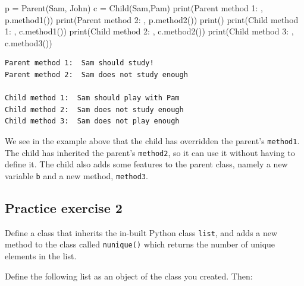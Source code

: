 \documentclass[
  letterpaper,
  DIV=11,
  numbers=noendperiod]{scrreprt}
\newenvironment{Shaded}{\begin{snugshade}}{\end{snugshade}}
\newcommand{\BuiltInTok}[1]{\textcolor[rgb]{0.00,0.23,0.31}{#1}}
\newcommand{\NormalTok}[1]{\textcolor[rgb]{0.00,0.23,0.31}{#1}}
\newcommand{\OperatorTok}[1]{\textcolor[rgb]{0.37,0.37,0.37}{#1}}
\newcommand{\StringTok}[1]{\textcolor[rgb]{0.13,0.47,0.30}{#1}}
\begin{document}
\begin{Shaded}
\begin{Highlighting}[]
\NormalTok{p }\OperatorTok{=}\NormalTok{ Parent(}\StringTok{\textquotesingle{}Sam\textquotesingle{}}\NormalTok{, }\StringTok{\textquotesingle{}John\textquotesingle{}}\NormalTok{)}
\NormalTok{c }\OperatorTok{=}\NormalTok{ Child(}\StringTok{\textquotesingle{}Sam\textquotesingle{}}\NormalTok{,}\StringTok{\textquotesingle{}Pam\textquotesingle{}}\NormalTok{)}
\BuiltInTok{print}\NormalTok{(}\StringTok{\textquotesingle{}Parent method 1: \textquotesingle{}}\NormalTok{, p.method1())}
\BuiltInTok{print}\NormalTok{(}\StringTok{\textquotesingle{}Parent method 2: \textquotesingle{}}\NormalTok{, p.method2())}
\BuiltInTok{print}\NormalTok{()}
\BuiltInTok{print}\NormalTok{(}\StringTok{\textquotesingle{}Child method 1: \textquotesingle{}}\NormalTok{, c.method1())}
\BuiltInTok{print}\NormalTok{(}\StringTok{\textquotesingle{}Child method 2: \textquotesingle{}}\NormalTok{, c.method2())}
\BuiltInTok{print}\NormalTok{(}\StringTok{\textquotesingle{}Child method 3: \textquotesingle{}}\NormalTok{, c.method3())}
\end{Highlighting}
\end{Shaded}

\begin{verbatim}
Parent method 1:  Sam should study!
Parent method 2:  Sam does not study enough 

Child method 1:  Sam should play with Pam
Child method 2:  Sam does not study enough 
Child method 3:  Sam does not play enough
\end{verbatim}

We see in the example above that the child has overridden the parent's
\texttt{method1}. The child has inherited the parent's \texttt{method2},
so it can use it without having to define it. The child also adds some
features to the parent class, namely a new variable \texttt{b} and a new
method, \texttt{method3}.

\hypertarget{practice-exercise-2-4}{%
\subsection{Practice exercise 2}\label{practice-exercise-2-4}}

Define a class that inherits the in-built Python class \texttt{list},
and adds a new method to the class called \texttt{nunique()} which
returns the number of unique elements in the list.

Define the following list as an object of the class you created. Then:
\end{document}
